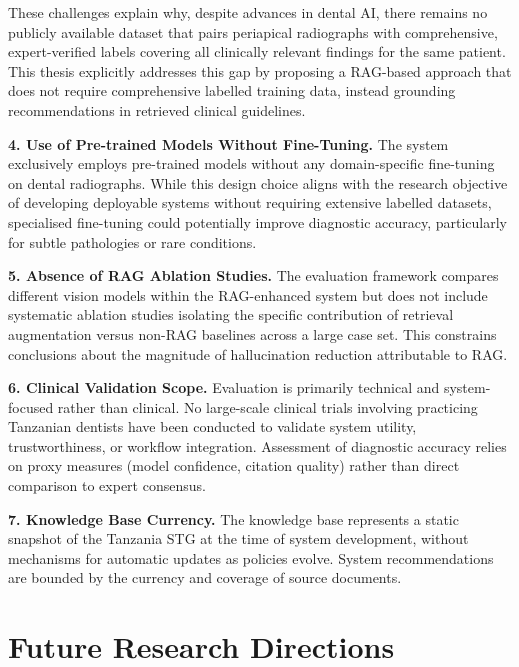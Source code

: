 \documentclass[12pt,a4paper]{report}
\begin{document}
These challenges explain why, despite advances in dental AI, there remains no publicly available dataset that pairs periapical radiographs with comprehensive, expert-verified labels covering all clinically relevant findings for the same patient. This thesis explicitly addresses this gap by proposing a RAG-based approach that does not require comprehensive labelled training data, instead grounding recommendations in retrieved clinical guidelines.

\textbf{4. Use of Pre-trained Models Without Fine-Tuning.} The system exclusively employs pre-trained models without any domain-specific fine-tuning on dental radiographs. While this design choice aligns with the research objective of developing deployable systems without requiring extensive labelled datasets, specialised fine-tuning could potentially improve diagnostic accuracy, particularly for subtle pathologies or rare conditions.

\textbf{5. Absence of RAG Ablation Studies.} The evaluation framework compares different vision models within the RAG-enhanced system but does not include systematic ablation studies isolating the specific contribution of retrieval augmentation versus non-RAG baselines across a large case set. This constrains conclusions about the magnitude of hallucination reduction attributable to RAG.

\textbf{6. Clinical Validation Scope.} Evaluation is primarily technical and system-focused rather than clinical. No large-scale clinical trials involving practicing Tanzanian dentists have been conducted to validate system utility, trustworthiness, or workflow integration. Assessment of diagnostic accuracy relies on proxy measures (model confidence, citation quality) rather than direct comparison to expert consensus.

\textbf{7. Knowledge Base Currency.} The knowledge base represents a static snapshot of the Tanzania STG at the time of system development, without mechanisms for automatic updates as policies evolve. System recommendations are bounded by the currency and coverage of source documents.

\section{Future Research Directions}
\label{sec:conclusion_future}
\end{document}

